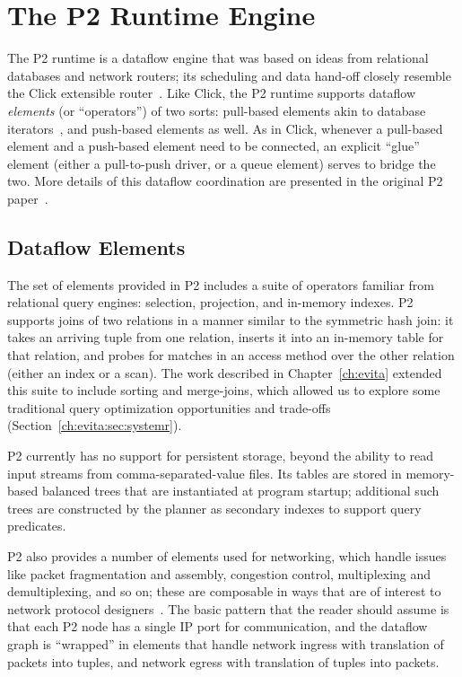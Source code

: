 \section{The P2 Runtime Engine}
\label{ch:p2:sec:p2}

The P2 runtime is a dataflow engine that was based on ideas from relational
databases and network routers; its scheduling and data hand-off closely
resemble the Click extensible router~\cite{click-tocs}.  Like Click, the P2
runtime supports dataflow {\em elements} (or ``operators'') of two sorts:
pull-based elements akin to database iterators~\cite{graefe-survey}, and
push-based elements as well.  As in Click, whenever a pull-based element and a
push-based element need to be connected, an explicit ``glue'' element (either a
pull-to-push driver, or a queue element) serves to bridge the two.  More
details of this dataflow coordination are presented in the original P2
paper~\cite{p2:sosp}.

\subsection{Dataflow Elements} 

The set of elements provided in P2 includes a suite of operators familiar from
relational query engines: selection, projection, and in-memory indexes.  P2
supports joins of two relations in a manner similar to the symmetric hash join:
it takes an arriving tuple from one relation, inserts it into an in-memory
table for that relation, and probes for matches in an access method over the
other relation (either an index or a scan).  The work described in
Chapter~\ref{ch:evita} extended this suite to include sorting and merge-joins,
which allowed us to explore some traditional query optimization opportunities
and trade-offs (Section~\ref{ch:evita:sec:systemr}).

P2 currently has no support for persistent storage, beyond the ability to read
input streams from comma-separated-value files.  Its tables are stored in
memory-based balanced trees that are instantiated at program startup;
additional such trees are constructed by the planner as secondary indexes to
support query predicates.

P2 also provides a number of elements used for networking, which handle issues
like packet fragmentation and assembly, congestion control, multiplexing and
demultiplexing, and so on; these are composable in ways that are of interest to
network protocol designers~\cite{condie-hotnets05}.  The basic pattern that the
reader should assume is that each P2 node has a single IP port for
communication, and the dataflow graph is ``wrapped'' in elements that handle
network ingress with translation of packets into tuples, and network egress
with translation of tuples into packets.

